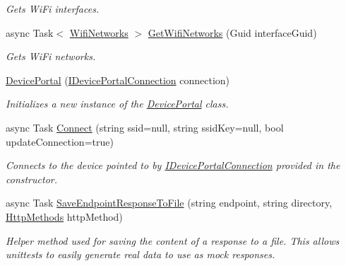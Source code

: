 \begin{DoxyCompactItemize}
\begin{DoxyCompactList}\small\item\em Gets Wi\+Fi interfaces. \end{DoxyCompactList}\item 
async Task$<$ \hyperlink{class_microsoft_1_1_tools_1_1_windows_device_portal_1_1_device_portal_1_1_wifi_networks}{Wifi\+Networks} $>$ \hyperlink{class_microsoft_1_1_tools_1_1_windows_device_portal_1_1_device_portal_a0eb0993f3f636335087eec6baf21b16b}{Get\+Wifi\+Networks} (Guid interface\+Guid)
\begin{DoxyCompactList}\small\item\em Gets Wi\+Fi networks. \end{DoxyCompactList}\item 
\hyperlink{class_microsoft_1_1_tools_1_1_windows_device_portal_1_1_device_portal_a6de4b419a50c147c3fb03aa26eb3017f}{Device\+Portal} (\hyperlink{interface_microsoft_1_1_tools_1_1_windows_device_portal_1_1_i_device_portal_connection}{I\+Device\+Portal\+Connection} connection)
\begin{DoxyCompactList}\small\item\em Initializes a new instance of the \hyperlink{class_microsoft_1_1_tools_1_1_windows_device_portal_1_1_device_portal}{Device\+Portal} class. \end{DoxyCompactList}\item 
async Task \hyperlink{class_microsoft_1_1_tools_1_1_windows_device_portal_1_1_device_portal_a6e4b933f133ab0589f34886e99e11a04}{Connect} (string ssid=null, string ssid\+Key=null, bool update\+Connection=true)
\begin{DoxyCompactList}\small\item\em Connects to the device pointed to by \hyperlink{interface_microsoft_1_1_tools_1_1_windows_device_portal_1_1_i_device_portal_connection}{I\+Device\+Portal\+Connection} provided in the constructor. \end{DoxyCompactList}\item 
async Task \hyperlink{class_microsoft_1_1_tools_1_1_windows_device_portal_1_1_device_portal_ad7f2833925310382e6e59dc7fab24fbd}{Save\+Endpoint\+Response\+To\+File} (string endpoint, string directory, \hyperlink{class_microsoft_1_1_tools_1_1_windows_device_portal_1_1_device_portal_a3c9db9126f53fec96711064f3fd6ef00}{Http\+Methods} http\+Method)
\begin{DoxyCompactList}\small\item\em Helper method used for saving the content of a response to a file. This allows unittests to easily generate real data to use as mock responses. \end{DoxyCompactList}\item 

\end{DoxyCompactItemize}
